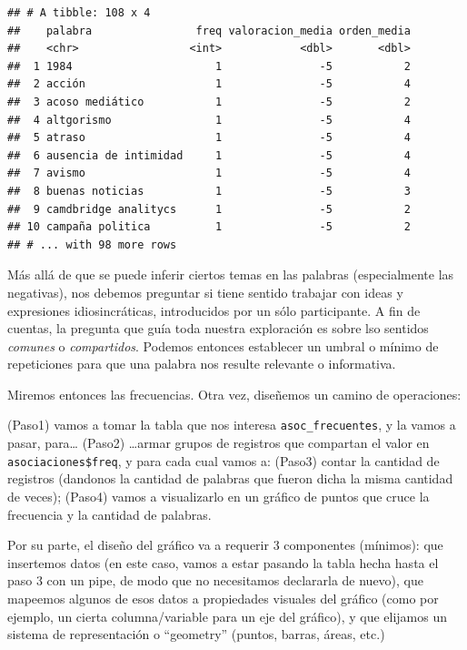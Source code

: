 \documentclass[
]{book}
\begin{document}
\begin{verbatim}
## # A tibble: 108 x 4
##    palabra                freq valoracion_media orden_media
##    <chr>                 <int>            <dbl>       <dbl>
##  1 1984                      1               -5           2
##  2 acción                    1               -5           4
##  3 acoso mediático           1               -5           2
##  4 altgorismo                1               -5           4
##  5 atraso                    1               -5           4
##  6 ausencia de intimidad     1               -5           4
##  7 avismo                    1               -5           4
##  8 buenas noticias           1               -5           3
##  9 camdbridge analitycs      1               -5           2
## 10 campaña politica          1               -5           2
## # ... with 98 more rows
\end{verbatim}

Más allá de que se puede inferir ciertos temas en las palabras (especialmente las negativas), nos debemos preguntar si tiene sentido trabajar con ideas y expresiones idiosincráticas, introducidos por un sólo participante. A fin de cuentas, la pregunta que guía toda nuestra exploración es sobre lso sentidos \emph{comunes} o \emph{compartidos}.
Podemos entonces establecer un umbral o mínimo de repeticiones para que una palabra nos resulte relevante o informativa.

Miremos entonces las frecuencias. Otra vez, diseñemos un camino de operaciones:

(Paso1) vamos a tomar la tabla que nos interesa \texttt{asoc\_frecuentes}, y la vamos a pasar, para\ldots{}
(Paso2) \ldots armar grupos de registros que compartan el valor en \texttt{asociaciones\$freq}, y para cada cual vamos a:
(Paso3) contar la cantidad de registros (dandonos la cantidad de palabras que fueron dicha la misma cantidad de veces);
(Paso4) vamos a visualizarlo en un gráfico de puntos que cruce la frecuencia y la cantidad de palabras.

Por su parte, el diseño del gráfico va a requerir 3 componentes (mínimos): que insertemos datos (en este caso, vamos a estar pasando la tabla hecha hasta el paso 3 con un pipe, de modo que no necesitamos declararla de nuevo), que mapeemos algunos de esos datos a propiedades visuales del gráfico (como por ejemplo, un cierta columna/variable para un eje del gráfico), y que elijamos un sistema de representación o ``geometry'' (puntos, barras, áreas, etc.)
\end{document}
